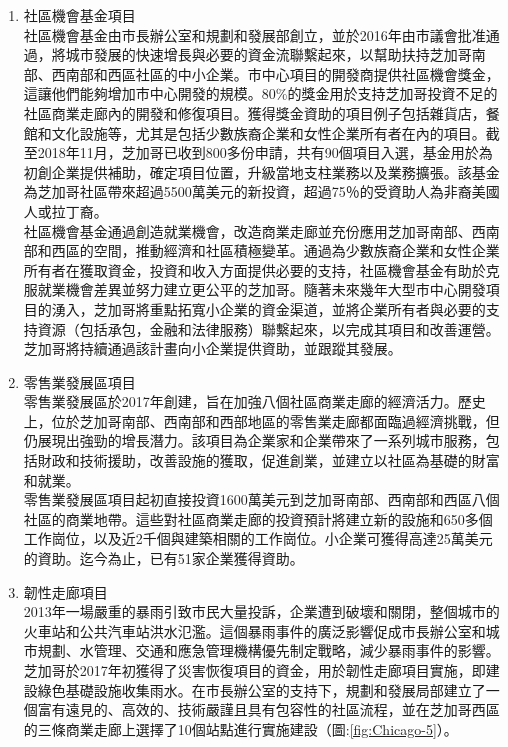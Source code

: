 \documentclass[a4paper,12pt]{article}
\begin{document}
\begin{enumerate}
\begin{enumerate}
\begin{enumerate}
\item 社區機會基金項目\\
社區機會基金由市長辦公室和規劃和發展部創立，並於2016年由市議會批准通過，將城市發展的快速增長與必要的資金流聯繫起來，以幫助扶持芝加哥南部、西南部和西區社區的中小企業。市中心項目的開發商提供社區機會獎金，這讓他們能夠增加市中心開發的規模。80\%的獎金用於支持芝加哥投資不足的社區商業走廊內的開發和修復項目。獲得獎金資助的項目例子包括雜貨店，餐館和文化設施等，尤其是包括少數族裔企業和女性企業所有者在內的項目。截至2018年11月，芝加哥已收到800多份申請，共有90個項目入選，基金用於為初創企業提供補助，確定項目位置，升級當地支柱業務以及業務擴張。該基金為芝加哥社區帶來超過5500萬美元的新投資，超過75％的受資助人為非裔美國人或拉丁裔。\\

社區機會基金通過創造就業機會，改造商業走廊並充份應用芝加哥南部、西南部和西區的空間，推動經濟和社區積極變革。通過為少數族裔企業和女性企業所有者在獲取資金，投資和收入方面提供必要的支持，社區機會基金有助於克服就業機會差異並努力建立更公平的芝加哥。隨著未來幾年大型市中心開發項目的湧入，芝加哥將重點拓寬小企業的資金渠道，並將企業所有者與必要的支持資源（包括承包，金融和法律服務）聯繫起來，以完成其項目和改善運營。芝加哥將持續通過該計畫向小企業提供資助，並跟蹤其發展。\\

\item 零售業發展區項目\\
零售業發展區於2017年創建，旨在加強八個社區商業走廊的經濟活力。歷史上，位於芝加哥南部、西南部和西部地區的零售業走廊都面臨過經濟挑戰，但仍展現出強勁的增長潛力。該項目為企業家和企業帶來了一系列城市服務，包括財政和技術援助，改善設施的獲取，促進創業，並建立以社區為基礎的財富和就業。\\

零售業發展區項目起初直接投資1600萬美元到芝加哥南部、西南部和西區八個社區的商業地帶。這些對社區商業走廊的投資預計將建立新的設施和650多個工作崗位，以及近2千個與建築相關的工作崗位。小企業可獲得高達25萬美元的資助。迄今為止，已有51家企業獲得資助。\\

\item 韌性走廊項目\\
2013年一場嚴重的暴雨引致市民大量投訴，企業遭到破壞和關閉，整個城市的火車站和公共汽車站洪水氾濫。這個暴雨事件的廣泛影響促成市長辦公室和城市規劃、水管理、交通和應急管理機構優先制定戰略，減少暴雨事件的影響。\\

芝加哥於2017年初獲得了災害恢復項目的資金，用於韌性走廊項目實施，即建設綠色基礎設施收集雨水。在市長辦公室的支持下，規劃和發展局部建立了一個富有遠見的、高效的、技術嚴謹且具有包容性的社區流程，並在芝加哥西區的三條商業走廊上選擇了10個站點進行實施建設（圖:\ref{fig:Chicago-5}）。\\


\end{enumerate}
\end{enumerate}
\end{enumerate}
\end{document}
